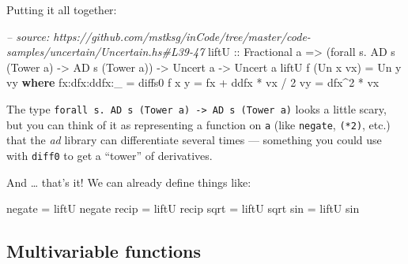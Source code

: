\documentclass[]{article}
\newenvironment{Shaded}{}{}
\newcommand{\KeywordTok}[1]{\textcolor[rgb]{0.00,0.44,0.13}{\textbf{#1}}}
\newcommand{\DataTypeTok}[1]{\textcolor[rgb]{0.56,0.13,0.00}{#1}}
\newcommand{\DecValTok}[1]{\textcolor[rgb]{0.25,0.63,0.44}{#1}}
\newcommand{\CommentTok}[1]{\textcolor[rgb]{0.38,0.63,0.69}{\textit{#1}}}
\newcommand{\OtherTok}[1]{\textcolor[rgb]{0.00,0.44,0.13}{#1}}
\newcommand{\FunctionTok}[1]{\textcolor[rgb]{0.02,0.16,0.49}{#1}}
\newcommand{\NormalTok}[1]{#1}
\begin{document}
Putting it all together:

\begin{Shaded}
\begin{Highlighting}[]
\CommentTok{-- source: https://github.com/mstksg/inCode/tree/master/code-samples/uncertain/Uncertain.hs#L39-47}
\OtherTok{liftU ::} \DataTypeTok{Fractional}\NormalTok{ a}
      \OtherTok{=>}\NormalTok{ (forall s}\FunctionTok{.} \DataTypeTok{AD}\NormalTok{ s (}\DataTypeTok{Tower}\NormalTok{ a) }\OtherTok{->} \DataTypeTok{AD}\NormalTok{ s (}\DataTypeTok{Tower}\NormalTok{ a))}
      \OtherTok{->} \DataTypeTok{Uncert}\NormalTok{ a}
      \OtherTok{->} \DataTypeTok{Uncert}\NormalTok{ a}
\NormalTok{liftU f (}\DataTypeTok{Un}\NormalTok{ x vx) }\FunctionTok{=} \DataTypeTok{Un}\NormalTok{ y vy}
  \KeywordTok{where}
\NormalTok{    fx}\FunctionTok{:}\NormalTok{dfx}\FunctionTok{:}\NormalTok{ddfx}\FunctionTok{:}\NormalTok{_ }\FunctionTok{=}\NormalTok{ diffs0 f x}
\NormalTok{    y             }\FunctionTok{=}\NormalTok{ fx }\FunctionTok{+}\NormalTok{ ddfx }\FunctionTok{*}\NormalTok{ vx }\FunctionTok{/} \DecValTok{2}
\NormalTok{    vy            }\FunctionTok{=}\NormalTok{ dfx}\FunctionTok{^}\DecValTok{2} \FunctionTok{*}\NormalTok{ vx}
\end{Highlighting}
\end{Shaded}

The type
\texttt{forall\ s.\ AD\ s\ (Tower\ a)\ -\textgreater{}\ AD\ s\ (Tower\ a)} looks
a little scary, but you can think of it as representing a function on \texttt{a}
(like \texttt{negate}, \texttt{(*2)}, etc.) that the \emph{ad} library can
differentiate several times --- something you could use with \texttt{diff0} to
get a ``tower'' of derivatives.

And \ldots{} that's it! We can already define things like:

\begin{Shaded}
\begin{Highlighting}[]
\NormalTok{negate }\FunctionTok{=}\NormalTok{ liftU negate}
\NormalTok{recip  }\FunctionTok{=}\NormalTok{ liftU recip}
\NormalTok{sqrt   }\FunctionTok{=}\NormalTok{ liftU sqrt}
\NormalTok{sin    }\FunctionTok{=}\NormalTok{ liftU sin}
\end{Highlighting}
\end{Shaded}

\subsection{Multivariable functions}\label{multivariable-functions}
\end{document}
